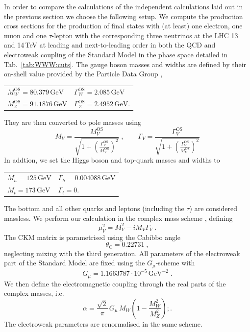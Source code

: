 In order to compare the calculations of the independent 
calculations laid out in the previous section we 
choose the following setup.
We compute the production cross sections for the production of 
final states with (at least) one electron, one muon and one 
$\tau$-lepton with the corresponding three neutrinos at the 
LHC 13 and 14\,TeV at leading and next-to-leading order 
in both the QCD and electroweak coupling of the Standard Model
in the phase space detailed in 
Tab.\ \ref{tab:WWW:cuts}. 
The gauge boson masses and widths are defined by their on-shell 
value provided by the Particle Data Group \cite{Tanabashi:2018oca}, 
\begin{center}
  \begin{tabular}{ll}
    $M_W^\text{OS}=80.379\,\text{GeV}$\qquad & $\Gamma_W^\text{OS}=2.085\,\text{GeV}$ \\
    $M_Z^\text{OS}=91.1876\,\text{GeV}$\qquad & $\Gamma_Z^\text{OS}=2.4952\,\text{GeV}$.
  \end{tabular}
\end{center}
They are then converted to pole masses using 
\begin{equation}
  M_V=\frac{M_V^\text{OS}}{\sqrt{1+\left(\frac{\Gamma_V^\text{OS}}{M_V^\text{OS}}\right)^2}}\;,
  \qquad
  \Gamma_V=\frac{\Gamma_V^\text{OS}}{\sqrt{1+\left(\frac{\Gamma_V^\text{OS}}{M_V^\text{OS}}\right)^2}}
\end{equation}
In addtion, we set the Higgs boson and top-quark masses 
and widths to 
\begin{center}
  \begin{tabular}{ll}
    $M_h=125\,\text{GeV}$ & $\Gamma_h=0.004088\,\text{GeV}$ \\
    $M_t=173\,\text{GeV}$ & $\Gamma_t=0$\;. \\
  \end{tabular}
\end{center}
The bottom and all other quarks and leptons (including the $\tau$) 
are considered massless.
We perform our calculation in the complex mass scheme 
\cite{Denner:2005fg,Denner:2014zga},
defining
\begin{equation}
  \mu_V^2=M_V^2-iM_V\Gamma_V\;.
\end{equation}
The CKM matrix is parametrised using the Cabibbo angle 
\begin{equation}
  \theta_\text{C}=0.22731\;,\nonumber
\end{equation}
neglecting mixing with the third generation. 
All parameters of the electroweak part of the Standard Model 
are fixed using the $G_\mu$-scheme \cite{} with
\begin{equation}
  G_\mu=1.1663787\cdot 10^{-5}\,\text{GeV}^{-2}\;.\nonumber
\end{equation}
We then define the electromagnetic coupling through the 
real parts of the complex masses, i.e.\
\begin{equation}
  \alpha=\frac{\sqrt{2}}{\pi}\,G_\mu\,M_W\left(1-\frac{M_W^2}{M_Z^2}\right);.
\end{equation}
The electroweak parameters are renormalised in the same scheme.


